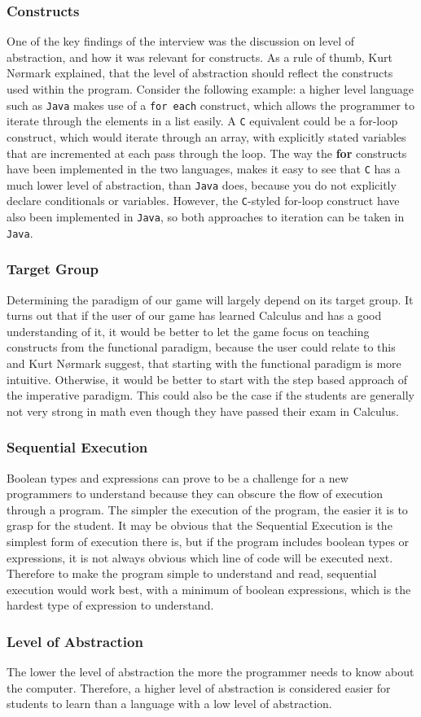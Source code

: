 \subsubsection{Constructs}

One of the key findings of the interview was the discussion on level of abstraction, and how it was relevant for constructs.
As a rule of thumb, Kurt N{\o}rmark explained, that the level of abstraction should reflect the constructs used within the program.
Consider the following example: a 
higher level language such as \texttt{Java} makes use of a \verb|for each| construct, which allows the programmer to iterate through the elements in a list easily.
A \texttt{C} equivalent could be a for-loop construct, which would iterate through an array, with explicitly stated variables that are incremented at each pass through the loop.
The way the \textbf{for} constructs have been implemented in the two languages, makes it easy to see that \texttt{C} has a much lower level of abstraction, than \texttt{Java} does, because you do not explicitly declare conditionals or variables. 
However, the \texttt{C}-styled for-loop construct have also been implemented in \texttt{Java}, so both approaches to iteration can be taken in \texttt{Java}.

\subsubsection{Target Group}

Determining the paradigm of our game will largely depend on its target group.
It turns out that if the user of our game has learned Calculus and has a good understanding of it, it would be better to let the game focus on teaching constructs from the functional paradigm, because the user could relate to this and Kurt N{\o}rmark suggest, that starting with the functional paradigm is more intuitive.
Otherwise, it would be better to start with the step based approach of the imperative paradigm.
This could also be the case if the students are generally not very strong in math even though they have passed their exam in Calculus.

\subsubsection{Sequential Execution}

Boolean types and expressions can prove to be a challenge for a new programmers to understand because they can obscure the flow of execution through a program.
The simpler the execution of the program, the easier it is to grasp for the student.
It may be obvious that the Sequential Execution is the simplest form of execution there is, but if the program includes boolean types or expressions, it is not always obvious which line of code will be executed next.
Therefore to make the program simple to understand and read, sequential execution would work best, with a minimum of boolean expressions, which is the hardest type of expression to understand.

\subsubsection{Level of Abstraction}

The lower the level of abstraction the more the programmer needs to know about the computer.
Therefore, a higher level of abstraction is considered easier for students to learn than a language with a low level of abstraction.
